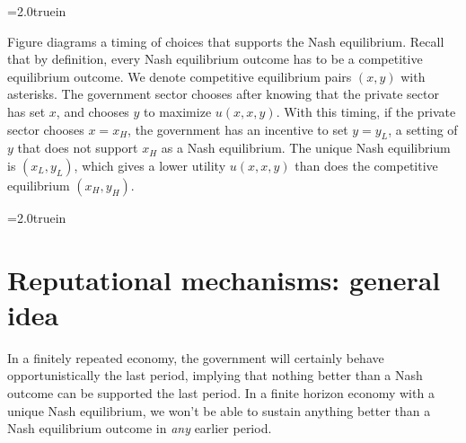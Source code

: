 \centerline{\epsfxsize=2.0truein}
\caption{Timing of choices that supports Ramsey outcome.  Here $P$ and
$G$ denote nodes at which the public and the government, respectively,
choose. The government has a commitment technology that binds it to
``choose first.''   The government chooses the $y \in Y$ that maximizes
$u[h(y)$, $h(y),y]$, where $x=h(y)$ is the function mapping government
actions into equilibrium values of $x$.}
\endfigure


Figure  diagrams a timing of choices that supports the
Nash equilibrium.  Recall that by definition, every Nash
equilibrium  outcome has to be a competitive equilibrium outcome.
We denote competitive equilibrium pairs $(x,y)$ with asterisks.
The government sector chooses after knowing that the private
sector has set $x$, and chooses $y$ to maximize
$u(x,x,y)$.  With this timing, if the private sector chooses
$x=x_H$, the government has an incentive to set $y=y_L$,
a setting of $y$ that does not support $x_H$ as a Nash
equilibrium.  The unique Nash equilibrium is $(x_L,y_L)$, which
gives a lower utility $u(x,x,y)$ than does
the competitive equilibrium $(x_H,y_H)$.


\centerline{\epsfxsize=2.0truein}
\caption{Timing of actions in a Nash equilibrium in which the private
sector acts first.  Here $G$ denotes a node at which the government
chooses and $P$ denotes a node at which the public chooses.  The private
sector sets $x \in X$ before knowing the government's setting of $y \in Y$.
Competitive equilibrium pairs $(x,y)$ are denoted with an asterisk.  The
unique Nash equilibrium is $(x_L, y_L)$.}
\endfigure


\section{Reputational mechanisms: general idea}

 In a finitely
repeated economy, the government will certainly behave opportunistically
the last period, implying that nothing better than a Nash
outcome can be supported the last period.  In a finite
horizon economy with  a unique Nash equilibrium, we won't be
able to sustain anything better than a Nash equilibrium
outcome in {\it any\/} earlier period.     


